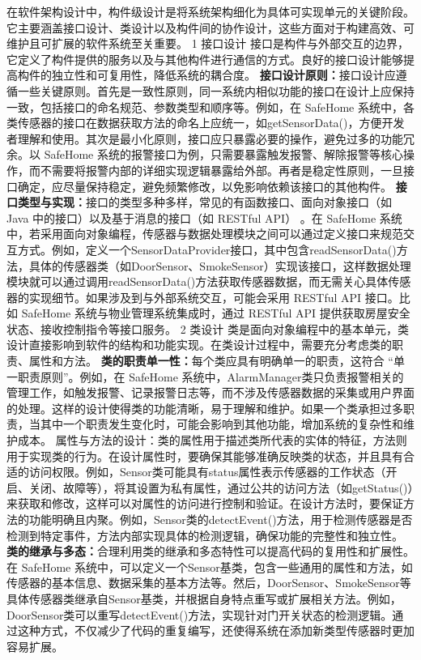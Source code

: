 在软件架构设计中，构件级设计是将系统架构细化为具体可实现单元的关键阶段。它主要涵盖接口设计、类设计以及构件间的协作设计，这些方面对于构建高效、可维护且可扩展的软件系统至关重要。 1 接口设计
接口是构件与外部交互的边界，它定义了构件提供的服务以及与其他构件进行通信的方式。良好的接口设计能够提高构件的独立性和可复用性，降低系统的耦合度。
\textbf{接口设计原则：}接口设计应遵循一些关键原则。首先是一致性原则，同一系统内相似功能的接口在设计上应保持一致，包括接口的命名规范、参数类型和顺序等。例如，在 SafeHome
系统中，各类传感器的接口在数据获取方法的命名上应统一，如getSensorData()，方便开发者理解和使用。其次是最小化原则，接口应只暴露必要的操作，避免过多的功能冗余。以 SafeHome
系统的报警接口为例，只需要暴露触发报警、解除报警等核心操作，而不需要将报警内部的详细实现逻辑暴露给外部。再者是稳定性原则，一旦接口确定，应尽量保持稳定，避免频繁修改，以免影响依赖该接口的其他构件。
\textbf{接口类型与实现：}接口的类型多种多样，常见的有函数接口、面向对象接口（如 Java 中的接口）以及基于消息的接口（如 RESTful API） 。在 SafeHome
系统中，若采用面向对象编程，传感器与数据处理模块之间可以通过定义接口来规范交互方式。例如，定义一个SensorDataProvider接口，其中包含readSensorData()方法，具体的传感器类（如DoorSensor、SmokeSensor）实现该接口，这样数据处理模块就可以通过调用readSensorData()方法获取传感器数据，而无需关心具体传感器的实现细节。如果涉及到与外部系统交互，可能会采用
RESTful API 接口。比如 SafeHome 系统与物业管理系统集成时，通过 RESTful API 提供获取房屋安全状态、接收控制指令等接口服务。 2 类设计
类是面向对象编程中的基本单元，类设计直接影响到软件的结构和功能实现。在类设计过程中，需要充分考虑类的职责、属性和方法。 \textbf{类的职责单一性：}每个类应具有明确单一的职责，这符合 ``单一职责原则''。例如，在 SafeHome
系统中，AlarmManager类只负责报警相关的管理工作，如触发报警、记录报警日志等，而不涉及传感器数据的采集或用户界面的处理。这样的设计使得类的功能清晰，易于理解和维护。如果一个类承担过多职责，当其中一个职责发生变化时，可能会影响到其他功能，增加系统的复杂性和维护成本。
属性与方法的设计：类的属性用于描述类所代表的实体的特征，方法则用于实现类的行为。在设计属性时，要确保其能够准确反映类的状态，并且具有合适的访问权限。例如，Sensor类可能具有status属性表示传感器的工作状态（开启、关闭、故障等），将其设置为私有属性，通过公共的访问方法（如getStatus()）来获取和修改，这样可以对属性的访问进行控制和验证。在设计方法时，要保证方法的功能明确且内聚。例如，Sensor类的detectEvent()方法，用于检测传感器是否检测到特定事件，方法内部实现具体的检测逻辑，确保功能的完整性和独立性。
\textbf{类的继承与多态：}合理利用类的继承和多态特性可以提高代码的复用性和扩展性。在 SafeHome
系统中，可以定义一个Sensor基类，包含一些通用的属性和方法，如传感器的基本信息、数据采集的基本方法等。然后，DoorSensor、SmokeSensor等具体传感器类继承自Sensor基类，并根据自身特点重写或扩展相关方法。例如，DoorSensor类可以重写detectEvent()方法，实现针对门开关状态的检测逻辑。通过这种方式，不仅减少了代码的重复编写，还使得系统在添加新类型传感器时更加容易扩展。
